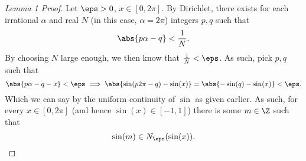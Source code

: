 \documentclass{article}
\begin{document}
\begin{proof}[Lemma 1 Proof]
  Let $\eps > 0$, $x \in [0, 2\pi]$. By Dirichlet, there exists for each irrational $\alpha$ and real $N$ (in this case, $\alpha = 2\pi$)
  integers $p, q$ such that
  \[ \abs{p\alpha - q} < \frac{1}{N}. \]
  By choosing $N$ large enough, we then know that $\frac{1}{N} < \eps$.
  As such, pick $p, q$ such that
  \[ \abs{p\alpha - q - x} < \eps \implies \abs{\sin(p2\pi - q) - \sin(x)} = \abs{-\sin(q) - \sin(x)} < \eps. \]
  Which we can say by the uniform continuity of $\sin$ as given earlier.
  As such, for every $x \in [0, 2\pi]$ (and hence $\sin(x) \in [-1, 1]$) there is some $m \in \Z$ such that
  \[ \sin(m) \in N_{\eps}(\sin(x)). \]
\end{proof}
\end{document}
